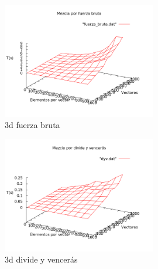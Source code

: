 \begin{figure}[htb] 
\centering
	\includegraphics[width=0.6\textwidth]{../Obligatorio/Graficas/3d_fuerza_bruta.png}
	\caption{3d fuerza bruta} 
	\label{fig:3d_f} 
\end{figure}

\begin{figure}[htb] 
\centering
	\includegraphics[width=0.6\textwidth]{../Obligatorio/Graficas/3d_dyv.png}
	\caption{3d divide y vencerás} 
	\label{fig:3d_d} 
\end{figure}

\newpage

{\ }

\newpage



